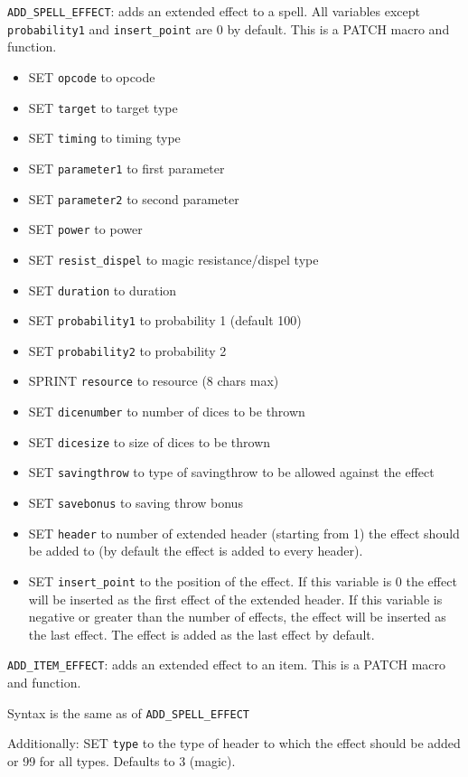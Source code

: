 \documentclass{article}
\begin{document}
\verb+ADD_SPELL_EFFECT+: adds an extended effect to a spell. All variables except \verb+probability1+ and \verb+insert_point+ are 0 by default.
This is a PATCH macro and function.
\begin{itemize}
\item SET \verb+opcode+ to opcode
\item SET \verb+target+ to target type
\item SET \verb+timing+ to timing type
\item SET \verb+parameter1+ to first parameter
\item SET \verb+parameter2+ to second parameter
\item SET \verb+power+ to power
\item SET \verb+resist_dispel+ to magic resistance/dispel type
\item SET \verb+duration+ to duration
\item SET \verb+probability1+ to probability 1 (default 100)
\item SET \verb+probability2+ to probability 2
\item SPRINT \verb+resource+ to resource (8 chars max)
\item SET \verb+dicenumber+ to number of dices to be thrown
\item SET \verb+dicesize+ to size of dices to be thrown
\item SET \verb+savingthrow+ to type of savingthrow to be allowed against the effect
\item SET \verb+savebonus+ to saving throw bonus
\item SET \verb+header+ to number of extended header (starting from 1) the effect should be added to (by default the effect is added to every header).
\item SET \verb+insert_point+ to the position of the effect. If this variable is 0 the effect will be inserted as the first effect of the extended header. If this variable is negative or greater than the number of effects, the effect will be inserted as the last effect. The effect is added as the last effect by default.
\end{itemize}

\verb+ADD_ITEM_EFFECT+: adds an extended effect to an item.
This is a PATCH macro and function.
\begin{list}{}{}
\item Syntax is the same as of \verb+ADD_SPELL_EFFECT+
\item Additionally: SET \verb+type+ to the type of header to which the effect should be added or 99 for all types. Defaults to 3 (magic).
\end{list}
\end{document}

